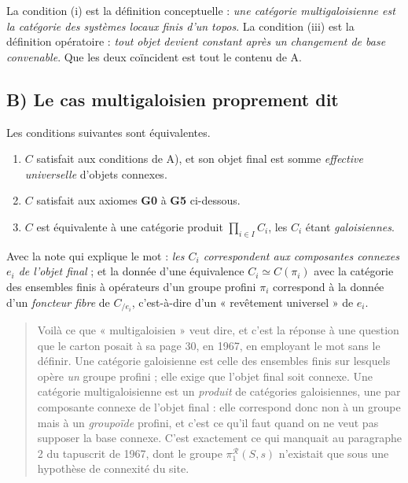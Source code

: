 \documentclass[11pt,a4paper]{article}
\begin{document}
La condition (i) est la définition conceptuelle : \emph{une catégorie
multigaloisienne est la catégorie des systèmes locaux finis d'un topos}. La
condition (iii) est la définition opératoire : \emph{tout objet devient
constant après un changement de base convenable}. Que les deux coïncident est
tout le contenu de A.

\subsection*{B) Le cas multigaloisien proprement dit}

Les conditions suivantes sont équivalentes.

\begin{enumerate}
  \item[(i)] $C$ satisfait aux conditions de A), et son objet final est somme
    \emph{effective universelle} d'objets connexes.
  \item[(ii)] $C$ satisfait aux axiomes \textbf{G0} à \textbf{G5} ci-dessous.
  \item[(iii)] $C$ est équivalente à une catégorie produit
    $\prod_{i \in I} C_{i}$, les $C_{i}$ étant \emph{galoisiennes}.
\end{enumerate}

Avec la note qui explique le mot : \emph{les $C_{i}$ correspondent aux
composantes connexes $e_{i}$ de l'objet final} ; et la donnée d'une équivalence
$C_{i} \simeq C(\pi_{i})$ avec la catégorie des ensembles finis à opérateurs
d'un groupe profini $\pi_{i}$ correspond à la donnée d'un \emph{foncteur fibre}
de $C_{/e_{i}}$, c'est-à-dire d'un « revêtement universel » de $e_{i}$.

\begin{quote}
Voilà ce que « multigaloisien » veut dire, et c'est la réponse à une question
que le carton posait à sa page 30, en 1967, en employant le mot sans le
définir. Une catégorie galoisienne est celle des ensembles finis sur lesquels
opère \emph{un} groupe profini ; elle exige que l'objet final soit connexe. Une
catégorie multigaloisienne est un \emph{produit} de catégories galoisiennes,
une par composante connexe de l'objet final : elle correspond donc non à un
groupe mais à un \emph{groupoïde} profini, et c'est ce qu'il faut quand on ne
veut pas supposer la base connexe. C'est exactement ce qui manquait au
paragraphe 2 du tapuscrit de 1967, dont le groupe
$\pi_{1}^{\mathcal{R}}(S,s)$ n'existait que sous une hypothèse de connexité du
site.
\end{quote}
\end{document}
